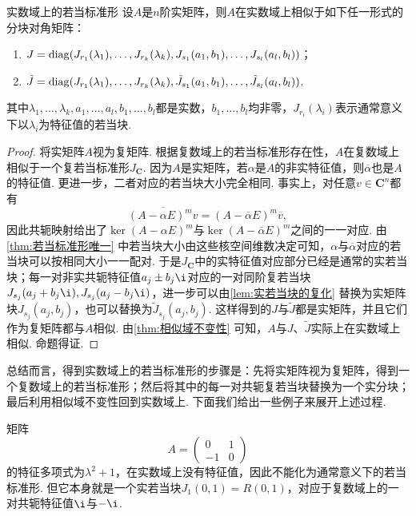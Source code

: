 \begin{theorem}{}{实数域上的若当标准形}
    设$A$是$n$阶实矩阵，则$A$在实数域上相似于如下任一形式的分块对角矩阵：
    \begin{enumerate}
        \item $J=\operatorname{diag}(J_{r_1}(\lambda_1),\ldots,J_{r_k}(\lambda_k),J_{s_1}(a_1,b_1),\ldots,J_{s_l}(a_l,b_l))$；
        \item $\tilde{J}=\operatorname{diag}(J_{r_1}(\lambda_1),\ldots,J_{r_k}(\lambda_k),\tilde{J}_{s_1}(a_1,b_1),\ldots,\tilde{J}_{s_l}(a_l,b_l))$.
    \end{enumerate}
    其中$\lambda_1,\ldots,\lambda_k,a_1,\ldots,a_l,b_1,\ldots,b_l$都是实数，$b_1,\ldots,b_l$均非零，$J_{r_i}(\lambda_i)$表示通常意义下以$\lambda_i$为特征值的若当块.
\end{theorem}
\begin{proof}
    将实矩阵$A$视为复矩阵. 根据复数域上的若当标准形存在性，$A$在复数域上相似于一个复若当标准形$J_{\mathbf{C}}$. 因为$A$是实矩阵，若$\alpha$是$A$的非实特征值，则$\overline{\alpha}$也是$A$的特征值. 更进一步，二者对应的若当块大小完全相同. 事实上，对任意$v\in\mathbf{C}^n$都有
    \[
        \overline{(A-\alpha E)^m v}=(A-\overline{\alpha}E)^m\overline{v},
    \]
    因此共轭映射给出了$\ker(A-\alpha E)^m$与$\ker(A-\overline{\alpha}E)^m$之间的一一对应. 由\autoref{thm:若当标准形唯一} 中若当块大小由这些核空间维数决定可知，$\alpha$与$\overline{\alpha}$对应的若当块可以按相同大小一一配对. 于是$J_{\mathbf{C}}$中的实特征值对应部分已经是通常的实若当块；每一对非实共轭特征值$a_j\pm b_j\i$对应的一对同阶复若当块 $J_{s_j}(a_j+b_j\i), J_{s_j}(a_j-b_j\i)$，进一步可以由\autoref{lem:实若当块的复化} 替换为实矩阵块$J_{s_j}(a_j,b_j)$，也可以替换为$\tilde{J}_{s_j}(a_j,b_j)$. 这样得到的$J$与$\tilde{J}$都是实矩阵，并且它们作为复矩阵都与$A$相似. 由\autoref{thm:相似域不变性} 可知，$A$与$J$、$\tilde{J}$实际上在实数域上相似. 命题得证.
\end{proof}

总结而言，得到实数域上的若当标准形的步骤是：先将实矩阵视为复矩阵，得到一个复数域上的若当标准形；然后将其中的每一对共轭复若当块替换为一个实分块；最后利用相似域不变性回到实数域上. 下面我们给出一些例子来展开上述过程.

\begin{example}{}{}
    矩阵
    \[
        A=\begin{pmatrix}
            0 & 1 \\ -1 & 0
        \end{pmatrix}
    \]
    的特征多项式为$\lambda^2+1$，在实数域上没有特征值，因此不能化为通常意义下的若当标准形. 但它本身就是一个实若当块$J_1(0,1)=R(0,1)$，对应于复数域上的一对共轭特征值$\i$与$-\i$.
\end{example}

